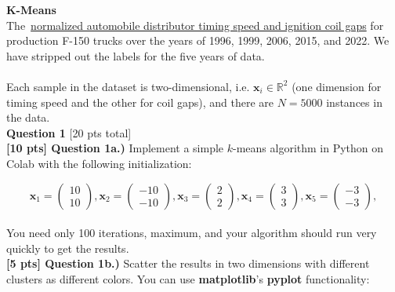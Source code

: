 \documentclass[paper=a4, fontsize=11pt]{scrartcl} %
\author{
    \textbf{Wu Chenjie} \\ 
    \textbf{@suiboli314} \\ 
    \textbf{wu.chenj@northeastern.edu}
}%
\begin{document}
\maketitle %

{\huge \textbf{K-Means}} \\

The~\href{https://course.ccs.neu.edu/cs6220/homework-4/data/}{normalized automobile distributor timing speed and ignition coil gaps} for production F-150 trucks over the years of 1996, 1999, 2006, 2015, and 2022. We have stripped out the labels for the five years of data.\\
\\
Each sample in the dataset is two-dimensional, i.e. $\textbf{x}_i \in \mathbb{R}^2$ (one dimension for timing speed and the other for coil gaps), and there are $N=5000$ instances in the data.
\\

{\Large \textbf{Question 1} [20 pts total]} \\

\textbf{[10 pts] Question 1a.)} Implement a simple $k$-means algorithm in Python on Colab with the following initialization:

\begin{equation}
\textbf{x}_1 = \left( \begin{matrix} 10 \\ 10 \end{matrix} \right), \textbf{x}_2 = \left( \begin{matrix} -10 \\ -10 \end{matrix} \right),
\textbf{x}_3 = \left( \begin{matrix} 2 \\ 2 \end{matrix} \right),
\textbf{x}_4 = \left( \begin{matrix} 3 \\ 3 \end{matrix} \right),
\textbf{x}_5 = \left( \begin{matrix} -3 \\ -3 \end{matrix} \right),
\nonumber
\end{equation} \\

You need only 100 iterations, maximum, and your algorithm should run very quickly to get the results. \\

\textbf{[5 pts] Question 1b.)} Scatter the results in two dimensions with different clusters as different colors. You can use \textbf{matplotlib}'s \textbf{pyplot} functionality:
\end{document}
